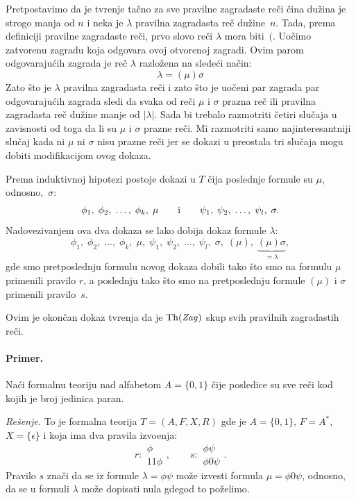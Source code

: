 Pretpostavimo da je tvr\dj enje ta\v cno za sve pravilne zagradaste re\v ci \v cina du\v zina je strogo
manja od $n$ i neka je $\lambda$ pravilna zagradasta re\v c du\v zine~$n$. Tada, prema definiciji
pravilne zagradaste re\v ci, prvo slovo re\v ci $\lambda$ mora biti~$($. Uo\v cimo zatvorenu zagradu
koja odgovara ovoj otvorenoj zagradi. Ovim parom odgovaraju\'cih zagrada je re\v c $\lambda$ razlo\v zena
na slede\'ci na\v cin:
$$
  \lambda = (\mu)\sigma
$$
Zato \v sto je $\lambda$ pravilna zagradasta re\v ci i zato \v sto je uo\v ceni par zagrada par
odgovaraju\'cih zagrada sledi da svaka od re\v ci $\mu$ i $\sigma$ prazna re\v c ili pravilna zagradasta
re\v c du\v zine manje od $|\lambda|$. Sada bi trebalo razmotriti \v cetiri slu\v caja u zavisnosti od
toga da li su $\mu$ i $\sigma$ prazne re\v ci. Mi razmotriti samo najinteresantniji slu\v caj
kada ni $\mu$ ni $\sigma$ nisu prazne re\v ci jer se dokazi u preostala tri slu\v caja mogu dobiti
modifikacijom ovog dokaza.

Prema induktivnoj hipotezi postoje dokazi u $T$ \v cija poslednje formule su $\mu$, odnosno,~$\sigma$:
$$
  \phi_1, \; \phi_2, \; \ldots, \; \phi_k, \; \mu \text{\qquad i\qquad}
  \psi_1, \; \psi_2, \; \ldots, \; \psi_l, \; \sigma.
$$
Nadovezivanjem ova dva dokaza se lako dobija dokaz formule $\lambda$:
$$
  \phi_1, \; \phi_2, \; \ldots, \; \phi_k, \; \mu, \;
  \psi_1, \; \psi_2, \; \ldots, \; \psi_l, \; \sigma, \;
  (\mu), \; \underbrace{(\mu)\sigma}_{= \lambda},
$$
gde smo pretposlednju formulu novog dokaza dobili tako \v sto smo na formulu $\mu$ primenili pravilo $r$,
a poslednju tako \v sto smo na pretposlednju formule $(\mu)$ i $\sigma$
primenili pravilo~$s$.

Ovim je okon\v can dokaz tvr\dj enja da je $\mathrm{Th}(\mathit{Zag})$ skup svih pravilnih zagradastih re\v ci.

\paragraph{Primer.} Na\'ci formalnu teoriju nad alfabetom $A = \{0, 1\}$ \v cije posledice su sve re\v ci
kod kojih je broj jedinica paran.

\medskip

\noindent
\textit{Re\v senje.} To je formalna teorija $T = (A, F, X, R)$ gde je $A = \{0, 1\}$, $F = A^*$,
$X = \{\epsilon\}$ i koja ima dva pravila izvo\dj enja:
$$
  r : \begin{array}{c}
    \phi \\ \hline
    11\phi
  \end{array}, \qquad
  s : \begin{array}{c}
    \phi\psi \\ \hline
    \phi0\psi
  \end{array}.
$$
Pravilo $s$ zna\v ci da se iz formule $\lambda = \phi\psi$ mo\v ze izvesti formula $\mu = \phi0\psi$,
odnosno, da se u formuli $\lambda$ mo\v ze dopisati nula gdegod to po\v zelimo.


